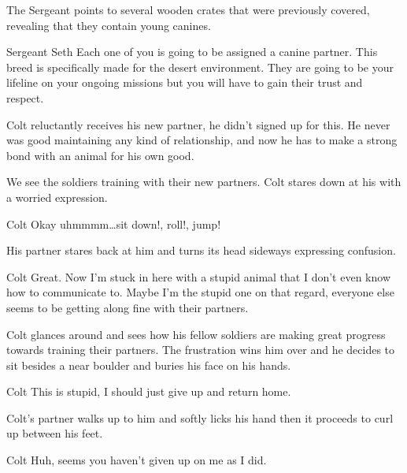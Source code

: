 \documentclass{screenplay}[2012/06/30]
\begin{document}
The Sergeant points to several wooden crates that were
previously covered, revealing that they contain young
canines.

\begin{dialogue}{Sergeant Seth}
    Each one of you is going to be assigned a canine partner.
    This breed is specifically made for the desert environment.
    They are going to be your lifeline on your ongoing missions
    but you will have to gain their trust and respect.
\end{dialogue}

Colt reluctantly receives his new partner, he didn't signed
up for this. He never was good maintaining any kind of
relationship, and now he has to make a strong bond with an
animal for his own good.

We see the soldiers training with their new partners. Colt
stares down at his with a worried expression.

\begin{dialogue}{Colt}
    Okay uhmmmm\dots sit down!, roll!, jump!
\end{dialogue}

His partner stares back at him and turns its head sideways
expressing confusion.

\begin{dialogue}[To himself]{Colt}
    Great. Now I'm stuck in here with a stupid animal
    that I don't even know how to communicate to. Maybe
    I'm the stupid one on that regard, everyone else
    seems to be getting along fine with their partners.
\end{dialogue}

Colt glances around and sees how his fellow soldiers are
making great progress towards training their partners. The
frustration wins him over and he decides to sit besides a near
boulder and buries his face on his hands.

\begin{dialogue}[To himself]{Colt}
    This is stupid, I should just give up and return home.
\end{dialogue}

Colt's partner walks up to him and softly licks his hand
then it proceeds to curl up between his feet.

\begin{dialogue}{Colt}
    Huh, seems you haven't given up on me as I did.
\end{dialogue}
\end{document}
